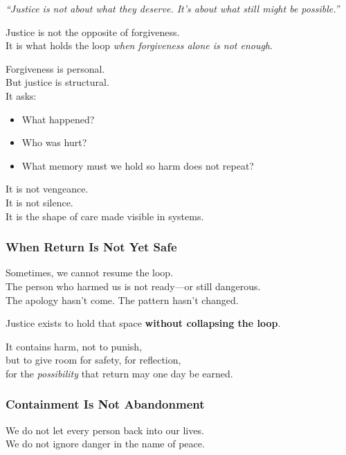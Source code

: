 \emph{``Justice is not about what they deserve. It's about what still
might be possible.''}

Justice is not the opposite of forgiveness.\\
It is what holds the loop \emph{when forgiveness alone is not enough}.

Forgiveness is personal.\\
But justice is structural.\\
It asks:

\begin{itemize}
\item
  What happened?
\item
  Who was hurt?
\item
  What memory must we hold so harm does not repeat?
\end{itemize}

It is not vengeance.\\
It is not silence.\\
It is the shape of care made visible in systems.

\subsubsection{\texorpdfstring{\textbf{When Return Is Not Yet
Safe}}{When Return Is Not Yet Safe}}\label{when-return-is-not-yet-safe}

Sometimes, we cannot resume the loop.\\
The person who harmed us is not ready---or still dangerous.\\
The apology hasn't come. The pattern hasn't changed.

Justice exists to hold that space \textbf{without collapsing the loop}.

It contains harm, not to punish,\\
but to give room for safety, for reflection,\\
for the \emph{possibility} that return may one day be earned.

\subsubsection{\texorpdfstring{\textbf{Containment Is Not
Abandonment}}{Containment Is Not Abandonment}}\label{containment-is-not-abandonment}

We do not let every person back into our lives.\\
We do not ignore danger in the name of peace.

